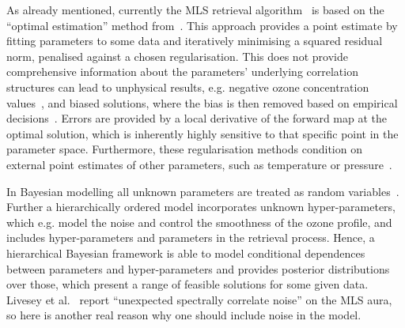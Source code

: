 As already mentioned, currently the MLS retrieval algorithm~\cite{livesey2006retrieval} is based on the ``optimal estimation'' method from~\cite{rodgers1976retrieval}.
This approach provides a point estimate by fitting parameters to some data and iteratively minimising a squared residual norm, penalised against a chosen regularisation.
This does not provide comprehensive information about the parameters' underlying correlation structures can lead to unphysical results, e.g. negative ozone concentration values~\cite{MLSdata}, and biased solutions, where the bias is then removed based on empirical decisions~\cite{livesey2008ozonecarbonmono, Froidevaux2008snrozone}.
Errors are provided by a local derivative of the forward map at the optimal solution, which is inherently highly sensitive to that specific point in the parameter space.
Furthermore, these regularisation methods condition on external point estimates of other parameters, such as temperature or pressure~\cite{livesey2006retrieval}.

In Bayesian modelling all unknown parameters are treated as random variables~\cite{kaipio2005statinv}.
Further a hierarchically ordered model incorporates unknown hyper-parameters, which e.g. model the noise and control the smoothness of the ozone profile, and includes hyper-parameters and parameters in the retrieval process.
Hence, a hierarchical Bayesian framework is able to model conditional dependences between parameters and hyper-parameters and provides posterior distributions over those, which present a range of feasible solutions for some given data.
Livesey et al.~\cite{livesey2006retrieval} report ``unexpected spectrally correlate noise'' on the MLS aura, so here is another real reason why one should include noise in the model.

